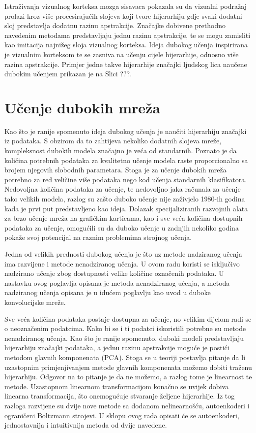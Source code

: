 \documentclass[lmodern, utf8, diplomski, numeric]{fer}
\begin{document}
Istraživanja vizualnog korteksa mozga sisavaca pokazala su da vizualni podražaj prolazi kroz više procesirajućih slojeva koji tvore hijerarhiju gdje svaki dodatni sloj predstavlja dodatnu razinu apstrakcije.  Značajke dobivene prethodno navedenim metodama predstavljaju jednu razinu apstrakcije, te se mogu zamisliti kao imitacija najnižeg sloja vizualnog korteksa. Ideja dubokog učenja inspirirana je vizualnim korteksom te se zasniva na učenju cijele hijerarhije, odnosno više razina apstrakcije. Primjer jedne takve hijerarhije značajki ljudskog lica naučene dubokim učenjem prikazan je na Slici ???.


\section{Učenje dubokih mreža}

Kao što je ranije spomenuto ideja dubokog učenja je naučiti hijerarhiju značajki iz podataka. S obzirom da to zahtijeva nekoliko dodatnih slojeva mreže, kompleksnost dubokih modela značajno je veća od standarnih. Poznato je da količina potrebnih podataka za kvalitetno učenje modela raste proporcionalno sa brojem njegovih slobodnih parametara. Stoga je za učenje dubokih mreža potrebno za red veličine više podataka nego kod učenja standarnih klasifikatora. Nedovoljna količina podataka za učenje, te nedovoljno jaka računala za učenje tako velikih modela, razlog su zašto duboko učenje nije zaživjelo 1980-ih godina kada je prvi put predstavljeno kao ideja. Dolazak specijaliziranih razvojnih alata za brzo učenje mreža na grafičkim karticama, kao i sve veća količina dostupnih podataka za učenje, omogućili su da duboko učenje u zadnjih nekoliko godina pokaže svoj potencijal na raznim problemima strojnog učenja.

Jedna od velikih prednosti dubokog učenja je što uz metode nadziranog učenja ima razvijene i metode nenadziranog učenja. U ovom radu koristi se isključivo nadzirano učenje zbog dostupnosti velike količine označenih podataka. U nastavku ovog poglavlja opisana je metoda nenadziranog učenja, a metoda nadziranog učenja opisana je u idućem poglavlju kao uvod u duboke konvolucijske mreže.

Sve veća količina podataka postaje dostupna za učenje, no velikim dijelom radi se o neoznačenim podatcima. Kako bi se i ti podatci iskoristili potrebne su metode nenadziranog učenja. Kao što je ranije spomenuto, duboki modeli predstavljaju hijerarhiju značajki podataka, a jednu razinu apstrakcije moguće je postići metodom glavnih komponenata (PCA). Stoga se u teoriji postavlja pitanje da li uzastopnim primjenjivanjem metode glavnih komponenata možemo dobiti traženu hijerarhiju. Odgovor na to pitanje je da ne možemo, a razlog tome je linearnost te metode. Uzastopnom linearnom transformacijom konačno se uvijek dobiva linearna transformacija, što onemogućuje stvaranje željene hijerarhije. Iz tog razloga razvijene su dvije nove metode sa dodanom nelinearnošću, autoenkoderi i ograničeni Boltzmann strojevi. U sklopu ovog rada opisati će se autoenkoderi, jednostavnija i intuitivnija metoda od dvije navedene.
\end{document}
